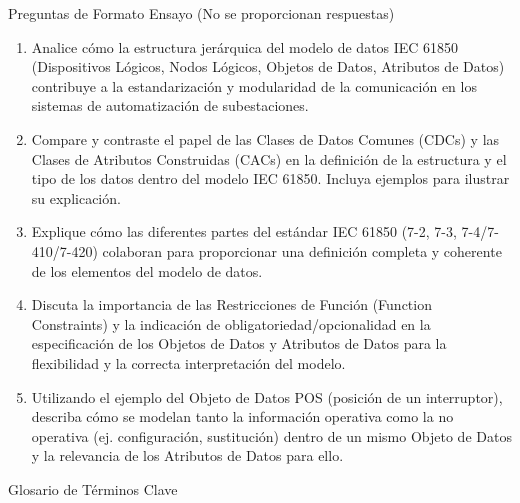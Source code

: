 \documentclass[a5paper]{book}%
\begin{document}
Preguntas de Formato Ensayo (No se proporcionan respuestas)

\begin{enumerate}
\item Analice cómo la estructura jerárquica del modelo de datos IEC 61850 (Dispositivos Lógicos, Nodos Lógicos, Objetos de Datos, Atributos de Datos) contribuye a la estandarización y modularidad de la comunicación en los sistemas de automatización de subestaciones.
\item Compare y contraste el papel de las Clases de Datos Comunes (CDCs) y las Clases de Atributos Construidas (CACs) en la definición de la estructura y el tipo de los datos dentro del modelo IEC 61850. Incluya ejemplos para ilustrar su explicación.
\item Explique cómo las diferentes partes del estándar IEC 61850 (7-2, 7-3, 7-4/7-410/7-420) colaboran para proporcionar una definición completa y coherente de los elementos del modelo de datos.
\item Discuta la importancia de las Restricciones de Función (Function Constraints) y la indicación de obligatoriedad/opcionalidad en la especificación de los Objetos de Datos y Atributos de Datos para la flexibilidad y la correcta interpretación del modelo.
\item Utilizando el ejemplo del Objeto de Datos POS (posición de un interruptor), describa cómo se modelan tanto la información operativa como la no operativa (ej. configuración, sustitución) dentro de un mismo Objeto de Datos y la relevancia de los Atributos de Datos para ello.
\end{enumerate}


Glosario de Términos Clave
\end{document}
